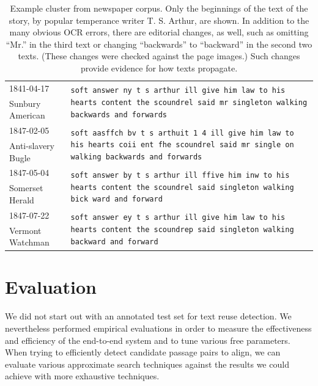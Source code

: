 \documentclass[pdftex,11pt]{article}
\begin{document}
\begin{table}
\small
  \centering
  \begin{tabular}{l l}
    1841-04-17 & \multirow{2}{0.7\textwidth}{\tt soft answer ny t s arthur ill give
      him law to his hearts content the scoundrel said mr singleton
      walking backwards and forwards} \\
    Sunbury American & \\ [2ex]
    1847-02-05 & \multirow{2}{0.7\textwidth}{\tt soft aasffch bv t s
      arthuit 1 4 ill give him law to his hearts coii ent fhe
      scoundrel said mr single on walking backwards and forwards} \\
    Anti-slavery Bugle & \\ [2ex]
    1847-05-04 & \multirow{2}{0.7\textwidth}{\tt soft answer by t s arthur
      ill ffive him inw to his hearts content the scoundrel said
      singleton walking bick ward and forward} \\
    Somerset Herald & \\ [2ex]
    1847-07-22 & \multirow{2}{0.7\textwidth}{\tt soft answer ey t s arthur
      ill give him law to his hearts content the scoundrep said
      singleton walking backward and forward} \\
    Vermont Watchman & \\
  \end{tabular}
  \caption{Example cluster from newspaper corpus. Only the beginnings
    of the text of the story, by popular temperance writer
    T. S. Arthur, are shown.  In addition to the many obvious OCR
    errors, there are editorial changes, as well, such as omitting
    ``Mr.'' in the third text or changing ``backwards'' to
    ``backward'' in the second two texts.  (These changes were
    checked against the page images.)  Such changes provide evidence
    for how texts propagate.}
  \label{tab:reprints}
\end{table}

\section{Evaluation}
\label{sec:evaluation}

We did not start out with an annotated test set for text reuse
detection.  We nevertheless performed empirical evaluations in order
to measure the effectiveness and efficiency of the end-to-end system
and to tune various free parameters.  When trying to efficiently
detect candidate passage pairs to align, we can evaluate various
approximate search techniques against the results we could achieve
with more exhaustive techniques.
\end{document}
